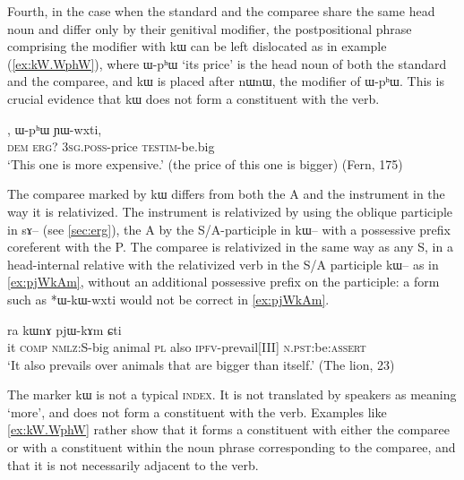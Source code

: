 \documentclass[oldfontcommands,oneside,a4paper,11pt]{article}
\newcommand{\ipa}[1]{{\phon #1}} %
\begin{document}
Fourth, in the case when   the standard and the comparee share the same head noun and differ only by their genitival modifier, the postpositional phrase comprising the modifier with \ipa{kɯ} can be left dislocated as in example (\ref{ex:kW.WphW}), where \ipa{ɯ-pʰɯ} `its price' is the head noun of both the standard and the comparee, and \ipa{kɯ} is placed after \ipa{nɯnɯ}, the  modifier of   \ipa{ɯ-pʰɯ}.  This is crucial evidence that \ipa{kɯ} does not form a constituent with the verb.

 \begin{exe}
\ex \label{ex:kW.WphW}
\gll 
[\ipa{nɯnɯ}]  	\ipa{kɯ},  	\ipa{ɯ-pʰɯ}  	\ipa{ɲɯ-wxti,}  \\
\textsc{dem} \textsc{erg?} \textsc{3sg.poss}-price \textsc{testim}-be.big \\
\glt `This one is more expensive.' (the price of this one is bigger) (Fern, 175)
\end{exe}

The comparee marked by \ipa{kɯ} differs from both the A and the instrument in the way it is relativized. The instrument is relativized by using the oblique participle in \ipa{sɤ--} (see \ref{sec:erg}), the A by the S/A-participle in \ipa{kɯ--} with a possessive prefix coreferent with the P. The comparee is relativized in the same way as any S, in a head-internal relative with the relativized verb in the S/A participle  \ipa{kɯ--} as in \ref{ex:pjWkAm}, without an additional possessive prefix on the participle: a form such as *\ipa{ɯ-kɯ-wxti} would not be correct in \ref{ex:pjWkAm}.

 
 
\begin{exe}
\ex \label{ex:pjWkAm}
\gll
[\ipa{ɯʑo}  	\ipa{sɤz}  	\ipa{kɯ-wxti}]  	\ipa{rɯdaʁ}  	\ipa{ra}  	\ipa{kɯnɤ}  	\ipa{pjɯ-kɤm}  	\ipa{ɕti}  \\
it \textsc{comp} \textsc{nmlz}:S-big animal \textsc{pl} also \textsc{ipfv}-prevail[III] \textsc{n.pst:}be:\textsc{assert} \\
\glt `It also prevails over animals that are bigger than itself.' (The lion, 23)
  \end{exe}

 
The marker   \ipa{kɯ} is not a typical  \textsc{index}. It is not translated by speakers as meaning `more', and does not form a constituent with the verb. Examples like \ref{ex:kW.WphW} rather show that it forms a constituent with either the comparee or with a constituent within the noun phrase corresponding to the comparee, and that it is not necessarily adjacent to the verb.
\end{document}
